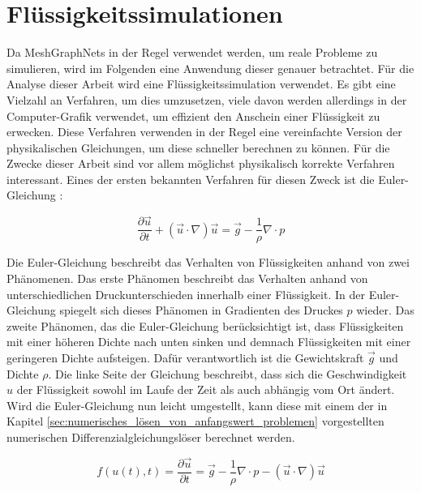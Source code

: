 
\section{Flüssigkeitssimulationen} \label{sec:simulationen}

Da MeshGraphNets in der Regel verwendet werden, um reale Probleme zu simulieren, 
wird im Folgenden eine Anwendung dieser genauer betrachtet.
Für die Analyse dieser Arbeit wird eine Flüssigkeitssimulation verwendet.
Es gibt eine Vielzahl an Verfahren, um dies umzusetzen,
viele davon werden allerdings in der Computer-Grafik verwendet, um 
effizient den Anschein einer Flüssigkeit zu erwecken.
Diese Verfahren verwenden in der Regel eine vereinfachte Version der physikalischen Gleichungen,
um diese schneller berechnen zu können.
Für die Zwecke dieser Arbeit sind vor allem möglichst physikalisch korrekte Verfahren interessant.
Eines der ersten bekannten Verfahren für diesen Zweck ist die Euler-Gleichung \cite[Kapitel~1]{navier_stokes}:

$$
\frac{\partial \vec{u}}{\partial t} + (\vec{u} \cdot \nabla) \vec{u} =  \vec{g} - \frac{1}{\rho} \nabla \cdot p
$$

Die Euler-Gleichung beschreibt das Verhalten von Flüssigkeiten anhand von zwei Phänomenen.
Das erste Phänomen beschreibt das Verhalten anhand von unterschiedlichen Druckunterschieden innerhalb einer Flüssigkeit.
In der Euler-Gleichung spiegelt sich dieses Phänomen in Gradienten des Druckes $p$ wieder.
Das zweite Phänomen, das die Euler-Gleichung berücksichtigt ist, dass Flüssigkeiten mit
einer höheren Dichte nach unten sinken und demnach Flüssigkeiten mit einer geringeren Dichte aufsteigen.
Dafür verantwortlich ist die Gewichtskraft $\vec{g}$ und Dichte $\rho$.
Die linke Seite der Gleichung beschreibt, dass sich die Geschwindigkeit $u$ der Flüssigkeit sowohl im Laufe 
der Zeit als auch abhängig vom Ort ändert.
Wird die Euler-Gleichung nun leicht umgestellt, 
kann diese mit einem der in Kapitel \ref{sec:numerisches_lösen_von_anfangswert_problemen} vorgestellten 
numerischen Differenzialgleichungslöser berechnet werden.

$$
f(u(t), t) = \frac{\partial \vec{u}}{\partial t}  =  \vec{g} - \frac{1}{\rho} \nabla \cdot p -  (\vec{u} \cdot \nabla) \vec{u}
$$

